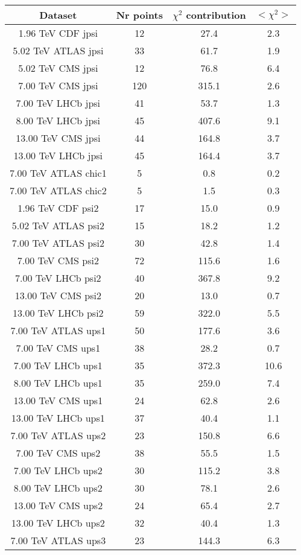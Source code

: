 \begin{table}[h!]
\centering
\begin{tabular}{c|c|c|c}
Dataset & Nr points & $\chi^2$ contribution & $<\chi^2>$ \\
\hline
1.96 TeV CDF jpsi & 12 & 27.4 & 2.3 \\
5.02 TeV ATLAS jpsi & 33 & 61.7 & 1.9 \\
5.02 TeV CMS jpsi & 12 & 76.8 & 6.4 \\
7.00 TeV CMS jpsi & 120 & 315.1 & 2.6 \\
7.00 TeV LHCb jpsi & 41 & 53.7 & 1.3 \\
8.00 TeV LHCb jpsi & 45 & 407.6 & 9.1 \\
13.00 TeV CMS jpsi & 44 & 164.8 & 3.7 \\
13.00 TeV LHCb jpsi & 45 & 164.4 & 3.7 \\
7.00 TeV ATLAS chic1 & 5 & 0.8 & 0.2 \\
7.00 TeV ATLAS chic2 & 5 & 1.5 & 0.3 \\
1.96 TeV CDF psi2 & 17 & 15.0 & 0.9 \\
5.02 TeV ATLAS psi2 & 15 & 18.2 & 1.2 \\
7.00 TeV ATLAS psi2 & 30 & 42.8 & 1.4 \\
7.00 TeV CMS psi2 & 72 & 115.6 & 1.6 \\
7.00 TeV LHCb psi2 & 40 & 367.8 & 9.2 \\
13.00 TeV CMS psi2 & 20 & 13.0 & 0.7 \\
13.00 TeV LHCb psi2 & 59 & 322.0 & 5.5 \\
7.00 TeV ATLAS ups1 & 50 & 177.6 & 3.6 \\
7.00 TeV CMS ups1 & 38 & 28.2 & 0.7 \\
7.00 TeV LHCb ups1 & 35 & 372.3 & 10.6 \\
8.00 TeV LHCb ups1 & 35 & 259.0 & 7.4 \\
13.00 TeV CMS ups1 & 24 & 62.8 & 2.6 \\
13.00 TeV LHCb ups1 & 37 & 40.4 & 1.1 \\
7.00 TeV ATLAS ups2 & 23 & 150.8 & 6.6 \\
7.00 TeV CMS ups2 & 38 & 55.5 & 1.5 \\
7.00 TeV LHCb ups2 & 30 & 115.2 & 3.8 \\
8.00 TeV LHCb ups2 & 30 & 78.1 & 2.6 \\
13.00 TeV CMS ups2 & 24 & 65.4 & 2.7 \\
13.00 TeV LHCb ups2 & 32 & 40.4 & 1.3 \\
7.00 TeV ATLAS ups3 & 23 & 144.3 & 6.3 \\

\end{tabular}
\end{table}
